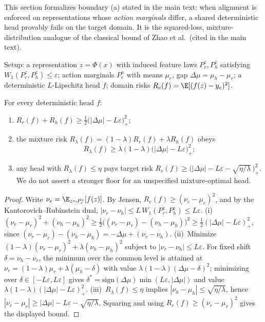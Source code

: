 This section formalizes boundary (a) stated in the main text: when alignment is enforced on representations whose \emph{action marginals} differ, a shared deterministic head provably fails on the target domain.
It is the squared-loss, mixture-distribution analogue of the classical bound of Zhao et al.\ (cited in the main text).

Setup: a representation $z = \Phi(x)$ with induced feature laws $P_r^z, P_h^z$ satisfying $W_1(P_r^z, P_h^z) \le \varepsilon$; action marginals $P_e^a$ with means $\mu_e$, gap $\Delta\mu = \mu_h - \mu_r$; a deterministic $L$-Lipschitz head $f$; domain risks $R_e(f) = \E[(f(z) - y_e)^2]$.

\begin{proposition}\label{supp:prop:zhao}
For every deterministic head $f$:
\begin{enumerate}
\item[(i)] $R_r(f) + R_h(f) \ge \tfrac12\big(|\Delta\mu| - L\varepsilon\big)_+^2$;
\item[(ii)] the mixture risk $R_\lambda(f) = (1-\lambda)R_r(f) + \lambda R_h(f)$ obeys
\begin{equation}
R_\lambda(f) \ge \lambda(1-\lambda)\big(|\Delta\mu| - L\varepsilon\big)_+^2;
\end{equation}
\item[(iii)] any head with $R_\lambda(f) \le \eta$ pays target risk
$R_r(f) \ge \big(|\Delta\mu| - L\varepsilon - \sqrt{\eta/\lambda}\,\big)_+^2$. We do not assert a stronger floor for an unspecified mixture-optimal head.
\end{enumerate}
\end{proposition}

\begin{proof}
Write $\nu_e = \E_{z \sim P_e^z}[f(z)]$.
By Jensen, $R_e(f) \ge (\nu_e - \mu_e)^2$, and by the Kantorovich--Rubinstein dual, $|\nu_r - \nu_h| \le L\, W_1(P_r^z, P_h^z) \le L\varepsilon$.
(i)~$(\nu_r-\mu_r)^2 + (\nu_h-\mu_h)^2 \ge \tfrac12\big((\nu_r-\mu_r) - (\nu_h-\mu_h)\big)^2 \ge \tfrac12(|\Delta\mu| - L\varepsilon)_+^2$, since $(\nu_r-\mu_r) - (\nu_h-\mu_h) = -\Delta\mu + (\nu_r - \nu_h)$.
(ii)~Minimize $(1-\lambda)(\nu_r-\mu_r)^2 + \lambda(\nu_h-\mu_h)^2$ subject to $|\nu_r-\nu_h| \le L\varepsilon$. For fixed shift $\delta = \nu_h - \nu_r$, the minimum over the common level is attained at $\nu_r = (1-\lambda)\mu_r + \lambda(\mu_h - \delta)$ with value $\lambda(1-\lambda)(\Delta\mu - \delta)^2$; minimizing over $\delta \in [-L\varepsilon, L\varepsilon]$ gives $\delta^* = \mathrm{sign}(\Delta\mu)\min(L\varepsilon, |\Delta\mu|)$ and value $\lambda(1-\lambda)(|\Delta\mu| - L\varepsilon)_+^2$.
(iii)~$R_\lambda(f) \le \eta$ implies $|\nu_h - \mu_h| \le \sqrt{\eta/\lambda}$, hence $|\nu_r - \mu_r| \ge |\Delta\mu| - L\varepsilon - \sqrt{\eta/\lambda}$. Squaring and using $R_r(f) \ge (\nu_r - \mu_r)^2$ gives the displayed bound.
\end{proof}

